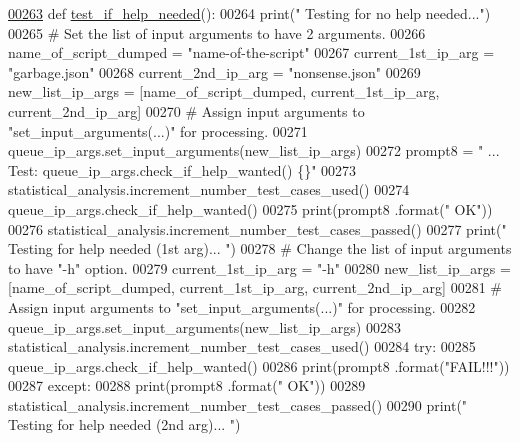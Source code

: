 \begin{DoxyCode}
\hypertarget{classutilities_1_1queue__ip__arguments__tester_1_1queue__ip__args__tester_l00263}{}\hyperlink{classutilities_1_1queue__ip__arguments__tester_1_1queue__ip__args__tester_a4af9d2177916d79d95fc9de5531162af}{00263}     \textcolor{keyword}{def }\hyperlink{classutilities_1_1queue__ip__arguments__tester_1_1queue__ip__args__tester_a4af9d2177916d79d95fc9de5531162af}{test\_if\_help\_needed}():
00264         print(\textcolor{stringliteral}{" Testing for no help needed..."})
00265         \textcolor{comment}{#   Set the list of input arguments to have 2 arguments.}
00266         name\_of\_script\_dumped = \textcolor{stringliteral}{"name-of-the-script"}
00267         current\_1st\_ip\_arg = \textcolor{stringliteral}{"garbage.json"}
00268         current\_2nd\_ip\_arg = \textcolor{stringliteral}{"nonsense.json"}
00269         new\_list\_ip\_args = [name\_of\_script\_dumped, current\_1st\_ip\_arg, current\_2nd\_ip\_arg]
00270         \textcolor{comment}{#   Assign input arguments to "set\_input\_arguments(...)" for processing.}
00271         queue\_ip\_args.set\_input\_arguments(new\_list\_ip\_args)
00272         prompt8 = \textcolor{stringliteral}{" ... Test: queue\_ip\_args.check\_if\_help\_wanted()  \{\}"}
00273         statistical\_analysis.increment\_number\_test\_cases\_used()
00274         queue\_ip\_args.check\_if\_help\_wanted()
00275         print(prompt8 .format(\textcolor{stringliteral}{" OK"}))
00276         statistical\_analysis.increment\_number\_test\_cases\_passed()
00277         print(\textcolor{stringliteral}{" Testing for help needed (1st arg)... "})
00278         \textcolor{comment}{#   Change the list of input arguments to have "-h" option.}
00279         current\_1st\_ip\_arg = \textcolor{stringliteral}{"-h"}
00280         new\_list\_ip\_args = [name\_of\_script\_dumped, current\_1st\_ip\_arg, current\_2nd\_ip\_arg]
00281         \textcolor{comment}{#   Assign input arguments to "set\_input\_arguments(...)" for processing.}
00282         queue\_ip\_args.set\_input\_arguments(new\_list\_ip\_args)
00283         statistical\_analysis.increment\_number\_test\_cases\_used()
00284         \textcolor{keywordflow}{try}:
00285             queue\_ip\_args.check\_if\_help\_wanted()
00286             print(prompt8 .format(\textcolor{stringliteral}{"FAIL!!!"}))
00287         \textcolor{keywordflow}{except}:
00288             print(prompt8 .format(\textcolor{stringliteral}{" OK"}))
00289             statistical\_analysis.increment\_number\_test\_cases\_passed()
00290         print(\textcolor{stringliteral}{" Testing for help needed (2nd arg)... "})

\end{DoxyCode}
